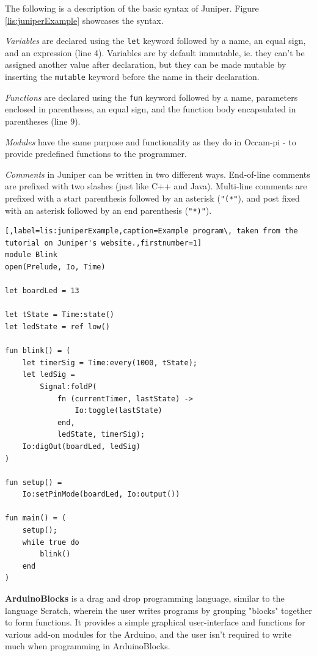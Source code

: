 The following is a description of the basic syntax of Juniper. 
Figure \ref{lis:juniperExample} showcases the syntax.

\textit{Variables} are declared using the \texttt{let} keyword followed by a name, an equal sign, and an expression (line 4).
Variables are by default immutable, ie. 
they can't be assigned another value after declaration, but they can be made mutable by inserting the \texttt{mutable} keyword before the name in their declaration.

\textit{Functions} are declared using the \texttt{fun} keyword followed by a name, parameters enclosed in parentheses, an equal sign, and the function body encapsulated in parentheses (line 9).

\textit{Modules} have the same purpose and functionality as they do in Occam-pi - to provide predefined functions to the programmer.

\textit{Comments} in Juniper can be written in two different ways.
End-of-line comments are prefixed with two slashes (just like C++ and Java).
Multi-line comments are prefixed with a start parenthesis followed by an asterisk (\texttt{"(*"}), and post fixed with an asterisk followed by an end parenthesis (\texttt{"*)"}).

\begin{lstlisting}[,label=lis:juniperExample,caption=Example program\, taken from the tutorial on Juniper's website.,firstnumber=1]
module Blink
open(Prelude, Io, Time)

let boardLed = 13

let tState = Time:state()
let ledState = ref low()

fun blink() = (
	let timerSig = Time:every(1000, tState);
	let ledSig =
		Signal:foldP(
			fn (currentTimer, lastState) ->
				Io:toggle(lastState)
			end,
			ledState, timerSig);
	Io:digOut(boardLed, ledSig)
)

fun setup() =
	Io:setPinMode(boardLed, Io:output())

fun main() = (
	setup();
	while true do
		blink()
	end
)
\end{lstlisting}

\textbf{ArduinoBlocks} is a drag and drop programming language, similar to the language Scratch, wherein the user writes programs by grouping "blocks" together to form functions.
It provides a simple graphical user-interface and functions for various add-on modules for the Arduino, and the user isn't required to write much when programming in ArduinoBlocks.

